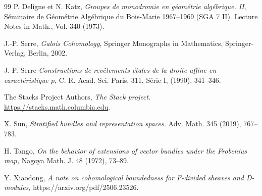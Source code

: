 \begin{thebibliography}{99}
P. Deligne et N. Katz, 
\textit{Groupes de monodromie en g\'eom\'etrie alg\'ebrique. II},  
S\'eminaire de G\'eom\'etrie Alg\'ebrique du Bois-Marie 1967--1969 (SGA 7 II).   
Lecture Notes in Math., Vol. 340 (1973).  

J.-P. Serre,
\emph{Galois Cohomology},
Springer Monographs in Mathematics,
Springer-Verlag, Berlin, 2002.

 J.-P. Serre  \textit{Constructions de rev\^etements \'etales de la droite affine en caract\'eristique $p$}, C. R. Acad. Sci. Paris, 311, S\'erie I, (1990), 341--346.

 The Stacks Project Authors, \textit{The Stack project}. \url{https://stacks.math.columbia.edu}.

 X. Sun,  
\textit{Stratified bundles and representation spaces.} 
Adv. Math. 345 (2019), 767--783.

 H. Tango,  \textit{On the behavior of extensions of vector bundles under the Frobenius map,}
Nagoya Math. J. 48 (1972), 73--89.

 Y. Xiaodong, \textit{A note on cohomological boundedness for F-divided sheaves and D-modules,} https://arxiv.org/pdf/2506.23526.


\end{thebibliography}
